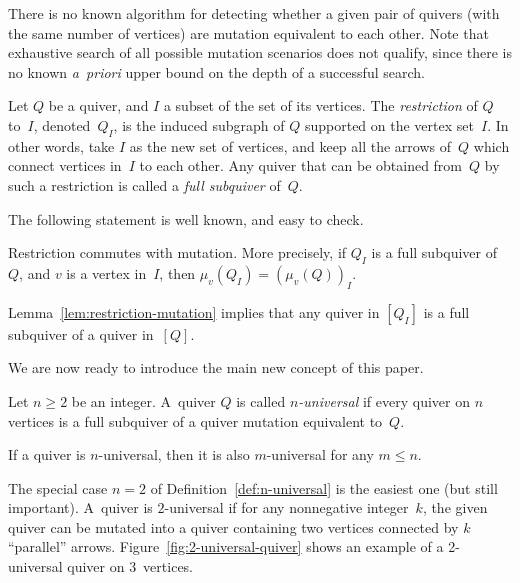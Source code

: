 \begin{remark}
There is no known algorithm for detecting whether a given pair of quivers (with the same number of vertices) are mutation equivalent to each other. Note that exhaustive search of all possible mutation scenarios does not qualify, since there is no known \emph{a~priori} upper bound on the depth of a successful search. 
\end{remark}

\begin{definition}
\label{def:full-subquiver}
Let $Q$ be a quiver, and $I$ a subset of the set of its vertices. The \emph{restriction} of $Q$ to~$I$, denoted~$Q_I$, is the induced subgraph of $Q$ supported on the vertex set~$I$. In other words, take $I$ as the new set of vertices, and keep all the arrows of~$Q$ which connect vertices in~$I$ to each other. Any quiver that can be obtained from~$Q$ by such a restriction is called a \emph{full subquiver} of~$Q$. 
\end{definition}


The following statement is well known, and easy to check.

\begin{lemma}
\label{lem:restriction-mutation}
Restriction commutes with mutation. More precisely, if $Q_I$ is a full sub\-quiver of~$Q$, and $v$ is a vertex in~$I$, then $\mu_v(Q_I)=(\mu_v(Q))_I$. 
\end{lemma}

Lemma~\ref{lem:restriction-mutation} implies that any quiver in 
$[Q_I]$ is a full subquiver of a quiver in~$[Q]$. 


We are now ready to introduce the main new concept of this paper. 

\begin{definition}
\label{def:n-universal}
Let $n\ge 2$ be an integer. 
A~quiver $Q$ is called \emph{$n$-universal} 
if every quiver on $n$ vertices is a full subquiver of a quiver mutation equivalent to~$Q$. 
\end{definition}

If a quiver is $n$-universal, then it is also $m$-universal for any $m\le n$. 

\begin{example}
The special case $n=2$ of Definition~\ref{def:n-universal} is the easiest one (but still important). A~quiver is $2$-universal if for any nonnegative integer~$k$, the given quiver can be mutated into a quiver containing two vertices connected by $k$ ``parallel'' arrows. 
%
Figure~\ref{fig:2-universal-quiver} shows an example of a 2-universal quiver on $3$~vertices. 
\end{example}

